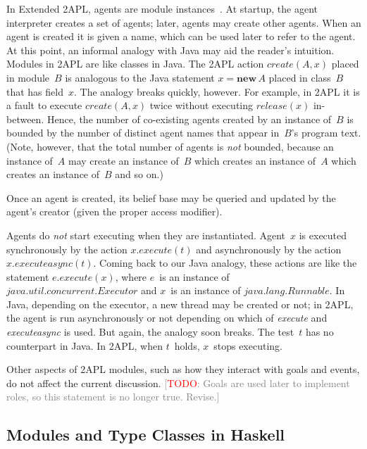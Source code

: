 \documentclass[conference,compsoc]{IEEEtran} %
\newcommand{\todo}[1]{{\small \textcolor{gray}{[\textcolor{red}{TODO}: #1]}}}
\begin{document}
In Extended 2APL, agents are module
instances~\cite{DBLP:conf/prima/DastaniMS08}. At startup, the agent
interpreter creates a set of agents; later, agents may create other agents.
When an agent is created it is given a name, which can be used later to
refer to the agent. At this point, an informal analogy with Java may aid
the reader's intuition. Modules in 2APL are like classes in Java. The 2APL
action $\mathit{create}(A,x)$ placed in module~$B$ is analogous to the Java
statement $x=\mathbf{new}\,A$ placed in class~$B$ that has field~$x$.  The
analogy breaks quickly, however. For example, in 2APL it is a fault to
execute $\mathit{create}(A,x)$ twice without executing
$\mathit{release}(x)$ in-between. Hence, the number of co-existing agents
created by an instance of~$B$ is bounded by the number of distinct agent
names that appear in~$B$'s program text. (Note, however, that the total
number of agents is \emph{not} bounded, because an instance of~$A$ may
create an instance of~$B$ which creates an instance of~$A$ which creates an
instance of~$B$ and so on.)

Once an agent is created, its belief base may be queried and updated by the
agent's creator (given the proper access modifier).

Agents do \emph{not} start executing when they are instantiated. Agent~$x$
is executed synchronously by the action $x.\mathit{execute}(t)$ and
asynchronously by the action $x.\mathit{executeasync}(t)$. Coming back to
our Java analogy, these actions are like the statement
$e.\mathit{execute}(x)$, where $e$~is an instance of
$\mathit{java}.\mathit{util}.\mathit{concurrent}.\mathit{Executor}$ and
$x$~is an instance of $\mathit{java}.\mathit{lang}.\mathit{Runnable}$.  In
Java, depending on the executor, a new thread may be created or not; in
2APL, the agent is run asynchronously or not depending on which of
\textit{execute} and \textit{executeasync} is used. But again, the analogy
soon breaks. The test~$t$ has no counterpart in Java. In 2APL, when
$t$~holds, $x$~stops executing.

Other aspects of 2APL modules, such as how they interact with goals and
events, do not affect the current discussion. \todo{Goals are used later to
implement roles, so this statement is no longer true. Revise.}

\subsection{Modules and Type Classes in Haskell} %
\end{document}
